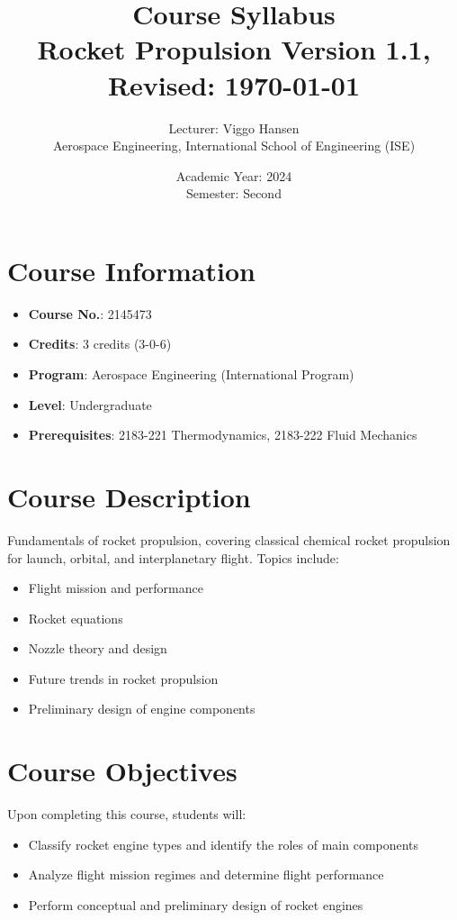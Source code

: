 \documentclass[12pt]{article}
\title{\textbf{Course Syllabus \\ Rocket Propulsion} \newline \small{Version 1.1, Revised: \today}}
\author{Lecturer: Viggo Hansen\\
Aerospace Engineering, International School of    
Engineering (ISE)}
\date{Academic Year: 2024 \\ Semester: Second}
\begin{document}
\maketitle

{
\hypersetup{linkcolor=black}
\tableofcontents
}

\section*{Course Information}
\label{sec:course_info}
\begin{itemize}
    \item \textbf{Course No.}: 2145473
    \item \textbf{Credits}: 3 credits (3-0-6)
    \item \textbf{Program}: Aerospace Engineering (International Program)
    \item \textbf{Level}: Undergraduate
    \item \textbf{Prerequisites}: 2183-221 Thermodynamics, 2183-222 Fluid Mechanics
\end{itemize}

\section*{Course Description}
Fundamentals of rocket propulsion, covering classical chemical rocket propulsion for launch, orbital, and interplanetary flight. Topics include:
\begin{itemize}
    \item Flight mission and performance
    \item Rocket equations
    \item Nozzle theory and design
    \item Future trends in rocket propulsion
    \item Preliminary design of engine components
\end{itemize}

\section*{Course Objectives}
Upon completing this course, students will:
\begin{itemize}
    \item Classify rocket engine types and identify the roles of main components
    \item Analyze flight mission regimes and determine flight performance
    \item Perform conceptual and preliminary design of rocket engines
\end{itemize}
\end{document}
